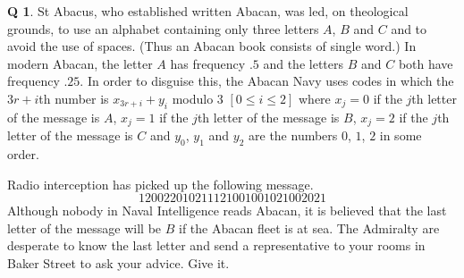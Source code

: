 \documentclass[12pt,a4paper]{article}
\theoremstyle{plain}
\theoremstyle{definition}
\newtheorem{question}[theorem]{Q}
\begin{document}
\begin{question}\label{E;abacus}\label{C4.11}
St Abacus, who established written Abacan,
was led, on theological grounds, to use an alphabet containing
only
three letters $A$, $B$ and $C$ and to avoid the use of
spaces. (Thus an Abacan book consists of single word.) 
In modern Abacan, the letter
$A$ has frequency $.5$ and the letters $B$ and $C$ both 
have frequency $.25$. In order to disguise this,
the Abacan Navy uses codes in which the
$3r+i$th number is $x_{3r+i}+y_{i}$ modulo $3$ $[0\leq i\leq 2]$
where $x_{j}=0$ if the $j$th letter of the message is $A$,
$x_{j}=1$ if the $j$th letter of the message is $B$,
$x_{j}=2$ if the $j$th letter of the message is $C$
and $y_{0}$, $y_{1}$ and $y_{2}$ are the numbers $0$, $1$, $2$
in some order.  

Radio interception has picked up the following message.
\[120022010211121001001021002021\]
Although nobody in Naval Intelligence reads Abacan, 
it is believed that the last letter of the message will
be $B$ if the Abacan fleet is at sea. 
The Admiralty are desperate to know the last letter
and send a representative to your rooms
in Baker Street to ask your advice. Give it.
\end{question} 
\end{document}
